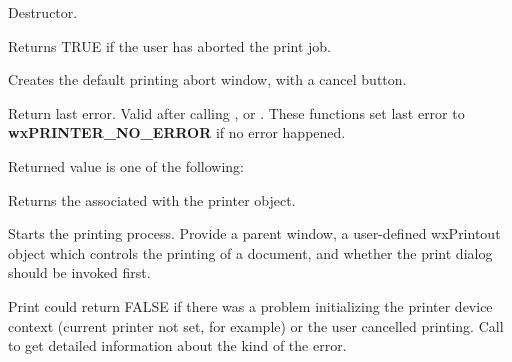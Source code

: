 
Destructor.

\label{wxprinterabort}


Returns TRUE if the user has aborted the print job.

\label{wxprintercreateabortwindow}


Creates the default printing abort window, with a cancel button.


\label{wxprintergetlasterror}


Return last error. Valid after calling ,
 or 
. These functions 
set last error to {\bf wxPRINTER\_NO\_ERROR} if no error happened.

Returned value is one of the following:

\twocolwidtha{7cm}
\begin{twocollist}\itemsep=0pt
\end{twocollist}


\label{wxprintergetprintdialogdata}


Returns the  associated with the printer object.

\label{wxprinterprint}


Starts the printing process. Provide a parent window, a user-defined wxPrintout object which controls
the printing of a document, and whether the print dialog should be invoked first.

Print could return FALSE if there was a problem initializing the printer device context
(current printer not set, for example) or the user cancelled printing. Call
 to get detailed
information about the kind of the error.

